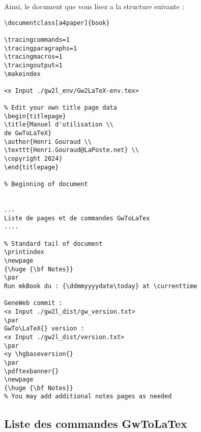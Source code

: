 Ainsi, le document que vous lisez a la structure suivante :

\begin{verbatim}
\documentclass[a4paper]{book}

\tracingcommands=1
\tracingparagraphs=1 
\tracingmacros=1
\tracingoutput=1
\makeindex

<x Input ./gw2l_env/Gw2LaTeX-env.tex>

% Edit your own title page data
\begin{titlepage}
\title{Manuel d'utilisation \\
de GwToLaTeX}
\author{Henri Gouraud \\
\texttt{Henri.Gouraud@LaPoste.net} \\
\copyright 2024}
\end{titlepage}

% Beginning of document


...
Liste de pages et de commandes GwToLaTex
....

% Standard tail of document
\printindex
\newpage
{\huge {\bf Notes}}
\par
Run mkBook du : {\ddmmyyyydate\today} at \currenttime

GeneWeb commit : 
<x Input ./gw2l_dist/gw_version.txt>
\par
GwTo\LaTeX{} version : 
<x Input ./gw2l_dist/version.txt>
\par
<y \hgbaseversion{}
\par
\pdftexbanner{}
\newpage
{\huge {\bf Notes}}
% You may add additional notes pages as needed 

\end{verbatim}

\subsection{Liste des commandes GwToLaTex}

